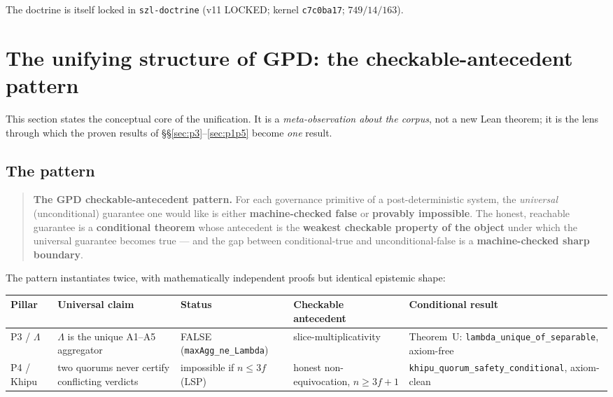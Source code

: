 \documentclass[11pt,letterpaper]{article}
\theoremstyle{definition}
\newcommand{\Lam}{\Lambda}
\begin{document}
The doctrine is itself locked in \texttt{szl-doctrine} (v11 LOCKED; kernel
\texttt{c7c0ba17}; $749/14/163$).

\section{The unifying structure of GPD: the checkable-antecedent pattern}\label{sec:pattern}

This section states the conceptual core of the unification. It is a
\emph{meta-observation about the corpus}, not a new Lean theorem; it is the lens
through which the proven results of \S\S\ref{sec:p3}--\ref{sec:p1p5} become
\emph{one} result.

\subsection{The pattern}
\begin{quote}
\textbf{The GPD checkable-antecedent pattern.} For each governance primitive of a
post-deterministic system, the \emph{universal} (unconditional) guarantee one
would like is either \textbf{machine-checked false} or \textbf{provably
impossible}. The honest, reachable guarantee is a \textbf{conditional theorem}
whose antecedent is the \textbf{weakest checkable property of the object} under
which the universal guarantee becomes true --- and the gap between
conditional-true and unconditional-false is a \textbf{machine-checked sharp
boundary}.
\end{quote}

The pattern instantiates twice, with mathematically independent proofs but
identical epistemic shape:

\begin{center}\small
\begin{tabular}{@{}p{1.6cm}p{3.0cm}p{2.3cm}p{3.0cm}p{2.7cm}@{}}
\toprule
\textbf{Pillar} & \textbf{Universal claim} & \textbf{Status} & \textbf{Checkable antecedent} & \textbf{Conditional result} \\
\midrule
P3 / $\Lam$ & $\Lam$ is the unique A1--A5 aggregator & FALSE (\texttt{maxAgg\_ne\_Lambda}) & slice-multiplicativity & Theorem~U: \texttt{lambda\_unique\_of\_separable}, axiom-free \\
P4 / Khipu & two quorums never certify conflicting verdicts & impossible if $n\le 3f$ (LSP) & honest non-equivocation, $n\ge 3f+1$ & \texttt{khipu\_quorum\_safety\_conditional}, axiom-clean \\
\bottomrule
\end{tabular}
\end{center}
\end{document}
